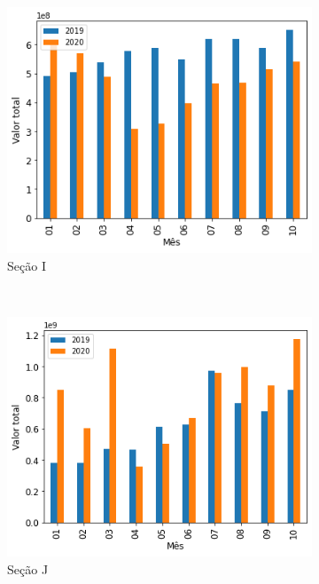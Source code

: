 \begin{figure}[htb]
    \begin{subfigure}[b]{0.45\textwidth}
        \includegraphics[scale=0.45]{images/base-de-dados-17.I-comparacao-valor-total-por-secao.png}
        \caption{Seção I}
        \label{fig:pandemia:descritiva-17.I-comparacao-valor-total-por-secao}
    \end{subfigure} ~ \quad
    \begin{subfigure}[b]{0.45\textwidth}
        \includegraphics[scale=0.45]{images/base-de-dados-17.J-comparacao-valor-total-por-secao.png}
        \caption{Seção J}
        \label{fig:pandemia:descritiva-17.J-comparacao-valor-total-por-secao}
    \end{subfigure} ~ \\
    \begin{subfigure}[b]{0.45\textwidth} 

\end{subfigure}
\end{figure}
